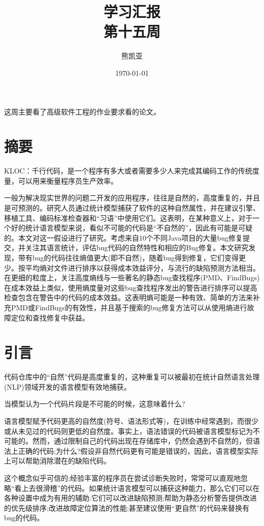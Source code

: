 \documentclass[a4paper]{article}
\title{学习汇报\\第十五周}
\author{熊凯亚}
\date{\today}
\begin{document}
\maketitle
这周主要看了高级软件工程的作业要求看的论文\cite{ray2016naturalness}。

\section{摘要}
KLOC：千行代码，是一个程序有多大或者需要多少人来完成其编码工作的传统度量，可以用来衡量程序员生产效率。

一般为解决现实世界的问题二开发的应用程序，往往是自然的，高度重复的，并且是可预测的。研究人员通过统计模型捕获了软件的这种自然属性，并在建议引擎、移植工具、编码标准检查器和“习语”中使用它们。这表明，在某种意义上，对于一个好的统计语言模型来说，看似不可能的代码是“不自然的”，因此有可能是可疑的。本文对这一假设进行了研究。考虑来自10个不同Java项目的大量bug修复提交，并关注其语言统计，评估bug代码的自然特性和相应的Bug修复。本文研究发现，带有bug的代码往往熵值更大(即不自然)，随着bug得到修复，它们变得更少。按平均熵对文件进行排序以获得成本效益评分，与流行的缺陷预测方法相当。在更细的粒度上，关注高度熵线与一些著名的静态bug查找程序(PMD、FindBugs)在成本效益上类似，使用熵度量对这些bug查找程序发出的警告进行排序可以提高检查包含在警告中的代码的成本效益。这表明熵可能是一种有效、简单的方法来补充PMD或FindBugs的有效性，并且基于搜索的bug修复方法可以从使用熵进行故障定位和查找修复中获益。

\section{引言}

代码仓库中的“自然”代码是高度重复的，这种重复可以被最初在统计自然语言处理(NLP)领域开发的语言模型有效地捕获。

当模型认为一个代码片段是不可能的时候，这意味着什么?

语言模型赋予代码更高的自然度(符号、语法形式等)，在训练中经常遇到，而很少或从未见过的代码则更低的自然度。事实上，语法错误的代码被语言模型标记为不可能的。然而，通过限制自己的代码出现在存储库中，仍然会遇到不自然的，但语法上正确的代码;为什么?假设非自然代码更有可能是错误的，因此，语言模型实际上可以帮助消除潜在的缺陷代码。

这个概念似乎可信的;经验丰富的程序员在尝试诊断失败时，常常可以直观地忽略“看上去很滑稽”的代码。如果统计语言模型可以捕获这种能力，那么它们可以在各种设置中成为有用的辅助:它们可以改进缺陷预测;帮助为静态分析警告提供改进的优先级排序;改进故障定位算法的性能;甚至建议使用“更自然”的代码来替换有bug的代码。
\end{document}
